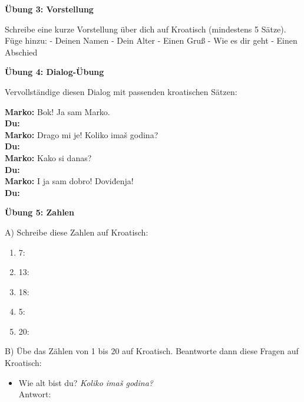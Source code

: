 \begin{exercise}
\vspace{2cm}

\textbf{Übung 3: Vorstellung}

Schreibe eine kurze Vorstellung über dich auf Kroatisch (mindestens 5 Sätze). Füge hinzu:
- Deinen Namen
- Dein Alter
- Einen Gruß
- Wie es dir geht
- Einen Abschied

\vspace{5cm}

\textbf{Übung 4: Dialog-Übung}

Vervollständige diesen Dialog mit passenden kroatischen Sätzen:

\textbf{Marko:} Bok! Ja sam Marko. \\
\textbf{Du:} \underline{\hspace{8cm}} \\
\textbf{Marko:} Drago mi je! Koliko imaš godina? \\
\textbf{Du:} \underline{\hspace{8cm}} \\
\textbf{Marko:} Kako si danas? \\
\textbf{Du:} \underline{\hspace{8cm}} \\
\textbf{Marko:} I ja sam dobro! Doviđenja! \\
\textbf{Du:} \underline{\hspace{8cm}}

\vspace{2cm}

\textbf{Übung 5: Zahlen}

A) Schreibe diese Zahlen auf Kroatisch:

\begin{enumerate}
    \item 7: \underline{\hspace{4cm}}
    \item 13: \underline{\hspace{4cm}}
    \item 18: \underline{\hspace{4cm}}
    \item 5: \underline{\hspace{4cm}}
    \item 20: \underline{\hspace{4cm}}
\end{enumerate}

B) Übe das Zählen von 1 bis 20 auf Kroatisch. Beantworte dann diese Fragen auf Kroatisch:

\begin{itemize}
    \item Wie alt bist du? \textit{Koliko imaš godina?} \\
    Antwort: \underline{\hspace{8cm}}
    

\end{itemize}
\end{exercise}
